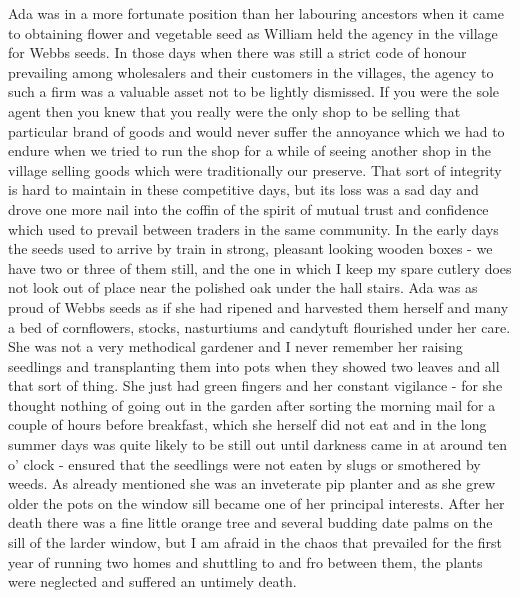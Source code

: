 Ada was in a more fortunate position than her labouring ancestors when it came to obtaining flower and vegetable seed as William held the agency in the village for Webbs seeds. In those days when there was still a strict code of honour prevailing among wholesalers and their customers in the villages, the agency to such a firm was a valuable asset not to be lightly dismissed. If you were the sole agent then you knew that you really were the only shop to be selling that particular brand of goods and would never suffer the annoyance which we had to endure when we tried to run the shop for a while of seeing another shop in the village selling goods which were traditionally our preserve. That sort of integrity is hard to maintain in these competitive days, but its loss was a sad day and drove one more nail into the coffin of the spirit of mutual trust and confidence which used to prevail between traders in the same community. In the early days the seeds used to arrive by train in strong, pleasant looking wooden boxes - we have two or three of them still, and the one in which I keep my spare cutlery does not look out of place near the polished oak under the hall stairs. Ada was as proud of Webbs seeds as if she had ripened and harvested them herself and many a bed of cornflowers, stocks, nasturtiums and candytuft flourished under her care. She was not a very methodical gardener and I never remember her raising seedlings and transplanting them into pots when they showed two leaves and all that sort of thing. She just had green fingers and her constant vigilance - for she thought nothing of going out in the garden after sorting the morning mail for a couple of hours before breakfast, which she herself did not eat and in the long summer days was quite likely to be still out until darkness came in at around ten o' clock - ensured that the seedlings were not eaten by slugs or smothered by weeds. As already mentioned she was an inveterate pip planter and as she grew older the pots on the window sill became one of her principal interests. After her death there was a fine little orange tree and several budding date palms on the sill of the larder window, but I am afraid in the chaos that prevailed for the first year of running two homes and shuttling to and fro between them, the plants were neglected and suffered an untimely death.

